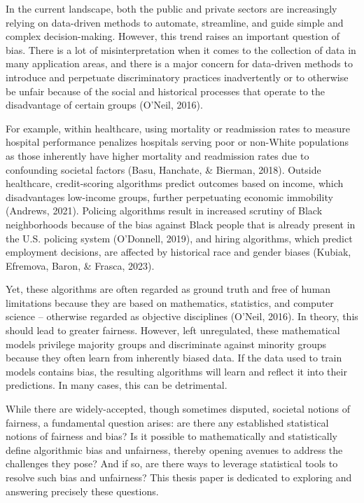 \documentclass[12pt, twoside]{amherstthesis}
\begin{document}
In the current landscape, both the public and private sectors are increasingly relying on data-driven methods to automate, streamline, and guide simple and complex decision-making. However, this trend raises an important question of bias. There is a lot of misinterpretation when it comes to the collection of data in many application areas, and there is a major concern for data-driven methods to introduce and perpetuate discriminatory practices inadvertently or to otherwise be unfair because of the social and historical processes that operate to the disadvantage of certain groups (O'Neil, 2016).

For example, within healthcare, using mortality or readmission rates to measure hospital performance penalizes hospitals serving poor or non-White populations as those inherently have higher mortality and readmission rates due to confounding societal factors (Basu, Hanchate, \& Bierman, 2018). Outside healthcare, credit-scoring algorithms predict outcomes based on income, which disadvantages low-income groups, further perpetuating economic immobility (Andrews, 2021). Policing algorithms result in increased scrutiny of Black neighborhoods because of the bias against Black people that is already present in the U.S. policing system (O'Donnell, 2019), and hiring algorithms, which predict employment decisions, are affected by historical race and gender biases (Kubiak, Efremova, Baron, \& Frasca, 2023).

Yet, these algorithms are often regarded as ground truth and free of human limitations because they are based on mathematics, statistics, and computer science -- otherwise regarded as objective disciplines (O'Neil, 2016). In theory, this should lead to greater fairness. However, left unregulated, these mathematical models privilege majority groups and discriminate against minority groups because they often learn from inherently biased data. If the data used to train models contains bias, the resulting algorithms will learn and reflect it into their predictions. In many cases, this can be detrimental.

While there are widely-accepted, though sometimes disputed, societal notions of fairness, a fundamental question arises: are there any established statistical notions of fairness and bias? Is it possible to mathematically and statistically define algorithmic bias and unfairness, thereby opening avenues to address the challenges they pose? And if so, are there ways to leverage statistical tools to resolve such bias and unfairness? This thesis paper is dedicated to exploring and answering precisely these questions.
\end{document}
